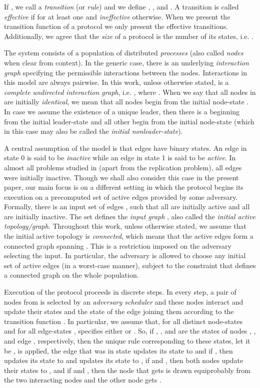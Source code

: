 \documentclass[preprint]{elsarticle}
\begin{document}
If , we call  a \emph{transition} (or \emph{rule}) and we define , , and . A transition  is called \emph{effective} if  for at least one  and \emph{ineffective} otherwise. When we present the transition function of a protocol we only present the effective transitions. Additionally, we agree that the \emph{size} of a protocol is the number of its states, i.e. .

The system consists of a population  of  distributed \emph{processes} (also called \emph{nodes} when clear from context). In the generic case, there is an underlying \emph{interaction graph}  specifying the permissible interactions between the nodes. Interactions in this model are always pairwise. In this work, unless otherwise stated,  is a \emph{complete undirected interaction graph}, i.e. , where . When we say that all nodes in  are initially \emph{identical}, we mean that all nodes begin from the initial node-state . In case we assume the existence of a unique leader, then there is a  beginning from the initial leader-state  and all other  begin from the initial node-state  (which in this case may also be called the \emph{initial nonleader-state}).

A central assumption of the model is that edges have binary states. An edge in state 0 is said to be \emph{inactive} while an edge in state 1 is said to be \emph{active}. In almost all problems studied in \cite{MS14} (apart from the replication problem), all edges were initially inactive. Though we shall also consider this case in the present paper, our main focus is on a different setting in which the protocol begins its execution on a precomputed set of active edges provided by some adversary. Formally, there is an input set of edges , such that all  are initially active and all  are initially inactive. The set  defines the \emph{input graph} , also called the \emph{initial active topology/graph}. Throughout this work, unless otherwise stated, we assume that the initial active topology is \emph{connected}, which means that the active edges form a connected graph spanning . This is a restriction imposed on the adversary selecting the input. In particular, the adversary is allowed to choose any initial set of active edges  (in a worst-case manner), subject to the constraint that  defines a connected graph on the whole population. 

Execution of the protocol proceeds in discrete steps. In every step, a pair of nodes  from  is selected by an \emph{adversary scheduler} and these nodes interact and update their states and the state of the edge joining them according to the transition function . In particular, we assume that, for all distinct node-states  and for all edge-states ,  specifies either  or . So, if , , and  are the states of nodes , , and edge , respectively, then the unique rule corresponding to these states, let it be , is applied, the edge that was in state  updates its state to  and if , then  updates its state to  and  updates its state to , if  and , then both nodes update their states to , and if  and , then the node that gets  is drawn equiprobably from the two interacting nodes and the other node gets . 
\end{document}

